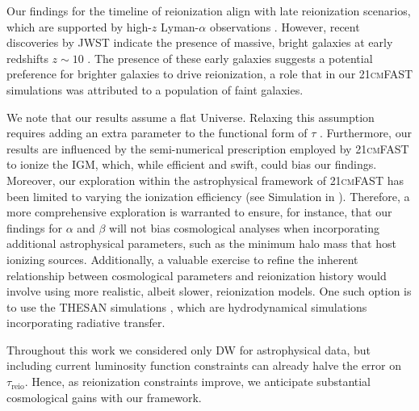 \documentclass[12pt]{article}
\newcommand{\reio}{\mathrm{reio}}
\begin{document}
Our findings for the timeline of reionization align with late
reionization scenarios, which are supported by high-$z$ Lyman-$\alpha$
observations \cite{Keating2020, Cain2021}.
However, recent discoveries by JWST indicate the presence of massive,
bright galaxies at early redshifts $z \sim 10$ \cite{Adams2023,
Bradley2023, Donnan2023}.
The presence of these early galaxies suggests a potential preference for
brighter galaxies to drive reionization, a role that in our
\textsc{21cmFAST} simulations was attributed to a population of faint
galaxies.

We note that our results assume a flat Universe.
Relaxing this assumption requires adding an extra parameter to the
functional form of $\tau$ \cite{Anselmi2023}.
Furthermore, our results are influenced by the semi-numerical
prescription employed by \textsc{21cmFAST} to ionize the IGM, which,
while efficient and swift, could bias our findings.
Moreover, our exploration within the astrophysical framework of
\textsc{21cmFAST} has been limited to varying the ionization efficiency
(see Simulation in \cite{methods}).
Therefore, a more comprehensive exploration is warranted to ensure, for
instance, that our findings for $\alpha$ and $\beta$ will not bias
cosmological analyses when incorporating additional astrophysical
parameters, such as the minimum halo mass that host ionizing sources.
Additionally, a valuable exercise to refine the inherent relationship
between cosmological parameters and reionization history would involve
using more realistic, albeit slower, reionization models.
One such option is to use the THESAN simulations \cite{Kannan2022},
which are hydrodynamical simulations incorporating radiative transfer.

Throughout this work we considered only DW for astrophysical data,
but including current luminosity function constraints can already halve
the error on $\tau_\reio$.
Hence, as reionization constraints improve, we anticipate substantial
cosmological gains with our framework.



\end{document}
